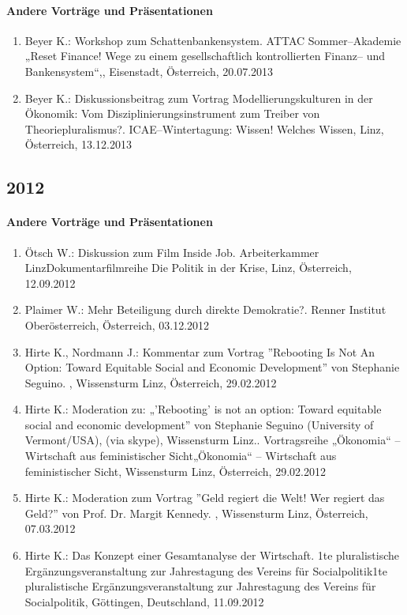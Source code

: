 \paragraph{Andere Vorträge und Präsentationen}
\begin{enumerate}
	\item Beyer K.: Workshop zum Schattenbankensystem. ATTAC Sommer--Akademie „Reset Finance! Wege zu einem gesellschaftlich kontrollierten Finanz-- und Bankensystem“,, Eisenstadt, Österreich, 20.07.2013
	\item Beyer K.: Diskussionsbeitrag zum Vortrag Modellierungskulturen in der Ökonomik: Vom Disziplinierungsinstrument zum Treiber von Theoriepluralismus?. ICAE--Wintertagung: Wissen! Welches Wissen, Linz, Österreich, 13.12.2013
\end{enumerate}
\subsection*{2012}
\paragraph{Andere Vorträge und Präsentationen}
\begin{enumerate}
	\item Ötsch W.: Diskussion zum Film Inside Job. Arbeiterkammer LinzDokumentarfilmreihe Die Politik in der Krise, Linz, Österreich, 12.09.2012
	\item Plaimer W.: Mehr Beteiligung durch direkte Demokratie?. Renner Institut Oberösterreich, Österreich, 03.12.2012
	\item Hirte K., Nordmann J.: Kommentar zum Vortrag ''Rebooting Is Not An Option: Toward Equitable Social and Economic Development'' von Stephanie Seguino. , Wissensturm Linz, Österreich, 29.02.2012
	\item Hirte K.: Moderation zu: „’Rebooting’ is not an option: Toward equitable social and economic development” von Stephanie Seguino (University of Vermont/USA), (via skype), Wissensturm Linz.. Vortragsreihe „Ökonomia“ -- Wirtschaft aus feministischer Sicht„Ökonomia“ -- Wirtschaft aus feministischer Sicht, Wissensturm Linz, Österreich, 29.02.2012
	\item Hirte K.: Moderation zum Vortrag ''Geld regiert die Welt! Wer regiert das Geld?'' von Prof. Dr. Margit Kennedy. , Wissensturm Linz, Österreich, 07.03.2012
	\item Hirte K.: Das Konzept einer Gesamtanalyse der Wirtschaft. 1te pluralistische Ergänzungsveranstaltung zur Jahrestagung des Vereins für Socialpolitik1te pluralistische Ergänzungsveranstaltung zur Jahrestagung des Vereins für Socialpolitik, Göttingen, Deutschland, 11.09.2012
\end{enumerate}

